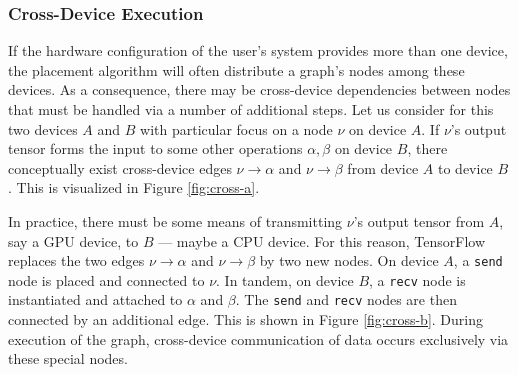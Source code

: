 \subsubsection{Cross-Device Execution}\label{sec:model-exec-single}

If the hardware configuration of the user's system provides more than one
device, the placement algorithm will often distribute a graph's nodes among
these devices. As a consequence, there may be cross-device dependencies between
nodes that must be handled via a number of additional steps. Let us consider for
this two devices $A$ and $B$ with particular focus on a node $\nu$ on device
$A$. If $\nu$'s output tensor forms the input to some other operations
$\alpha, \beta$ on device $B$, there conceptually exist cross-device edges
$\nu \rightarrow \alpha$ and $\nu \rightarrow \beta$ from device $A$ to device
$B$. This is visualized in Figure \ref{fig:cross-a}.

In practice, there must be some means of transmitting $\nu$'s output tensor from
$A$, say a GPU device, to $B$ --- maybe a CPU device. For this reason,
TensorFlow replaces the two edges $\nu \rightarrow \alpha$ and
$\nu \rightarrow \beta$ by two new nodes. On device $A$, a \texttt{send} node is
placed and connected to $\nu$. In tandem, on device $B$, a \texttt{recv} node is
instantiated and attached to $\alpha$ and $\beta$. The \texttt{send} and
\texttt{recv} nodes are then connected by an additional edge. This is shown in
Figure \ref{fig:cross-b}. During execution of the graph, cross-device
communication of data occurs exclusively via these special nodes.


